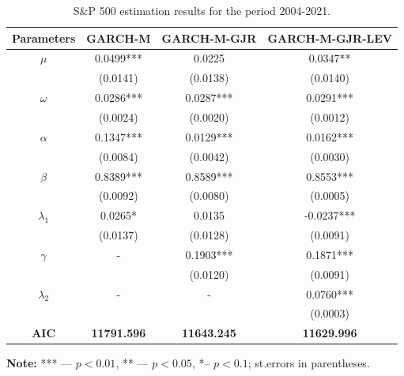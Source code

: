 \documentclass[authoryear, 1p]{elsarticle}
\numberwithin{equation}{section}
\begin{document}
\begin{table}[h!]
\caption{S\&P 500 estimation results for the period 2004-2021.}
\begin{center}
\label{tab:tab_4}
\begin{tabular*}{\textwidth}{cccc}
\hline
\hline
\multicolumn{1}{c}{\textbf{Parameters}} & \textbf{GARCH-M} & \textbf{GARCH-M-GJR} & \textbf{GARCH-M-GJR-LEV} \\
\hline
\hline

$\mu$                                      & 0.0499***        & 0.0225               & 0.0347**                 \\
                                        & (0.0141)         & (0.0138)             & (0.0140)                 \\
$\omega$                                   & 0.0286***        & 0.0287***            & 0.0291***                \\
                                        & (0.0024)         & (0.0020)             & (0.0012)                 \\
$\alpha$                                   & 0.1347***        & 0.0129***            & 0.0162***                \\
                                        & (0.0084)         & (0.0042)             & (0.0030)                 \\
$\beta$                                    & 0.8389***        & 0.8589***            & 0.8553***                \\
                                        & (0.0092)         & (0.0080)             & (0.0005)                 \\
$\lambda_{1}$                                  & 0.0265*          & 0.0135               & -0.0237***               \\
                                        & (0.0137)         & (0.0128)             & (0.0091)                 \\
$\gamma$                                   & -                & 0.1903***            & 0.1871***                   \\
                                        &                  & (0.0120)             & (0.0091)                 \\
$\lambda_{2}$                               & -                & -                    & 0.0760***                \\
                                        &                  &                      & (0.0003)                 \\
\hline
\textbf{AIC}                                     & \textbf{11791.596}            & \textbf{11643.245}                & \textbf{11629.996}                    \\
\hline
\hline
\end{tabular*}
\end{center}
\footnotesize
\renewcommand{\baselineskip}{11pt}
\textbf{Note:} *** —  $p<0.01$, ** —  $p < 0.05$, *– $p < 0.1$; st.errors in parentheses.
\end{table}
\end{document}
